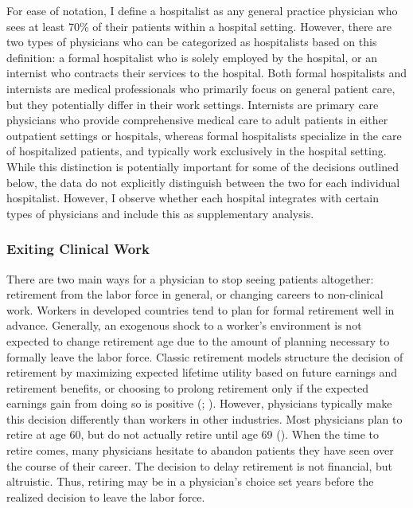 \documentclass[12pt]{article}
\begin{document}
For ease of notation, I define a hospitalist as any general practice physician who sees at least 70\% of their patients within a hospital setting. However, there are two types of physicians who can be categorized as hospitalists based on this definition: a formal hospitalist who is solely employed by the hospital, or an internist who contracts their services to the hospital. Both formal hospitalists and internists are medical professionals who primarily focus on general patient care, but they potentially differ in their work settings. Internists are primary care physicians who provide comprehensive medical care to adult patients in either outpatient settings or hospitals, whereas formal hospitalists specialize in the care of hospitalized patients, and typically work exclusively in the hospital setting. While this distinction is potentially important for some of the decisions outlined below, the data do not explicitly distinguish between the two for each individual hospitalist. However, I observe whether each hospital integrates with certain types of physicians and include this as supplementary analysis. 

\subsubsection{Exiting Clinical Work}

There are two main ways for a physician to stop seeing patients altogether: retirement from the labor force in general, or changing careers to non-clinical work. Workers in developed countries tend to plan for formal retirement well in advance. Generally, an exogenous shock to a worker's environment is not expected to change retirement age due to the amount of planning necessary to formally leave the labor force. Classic retirement models structure the decision of retirement by maximizing expected lifetime utility based on future earnings and retirement benefits, or choosing to prolong retirement only if the expected earnings gain from doing so is positive (\cite{gustman1986disaggregated}; \cite{stock1990pension}). However, physicians typically make this decision differently than workers in other industries. Most physicians plan to retire at age 60, but do not actually retire until age 69 (\cite{collier2017challenges}). When the time to retire comes, many physicians hesitate to abandon patients they have seen over the course of their career. The decision to delay retirement is not financial, but altruistic. Thus, retiring may be in a physician's choice set years before the realized decision to leave the labor force. 
\end{document}

